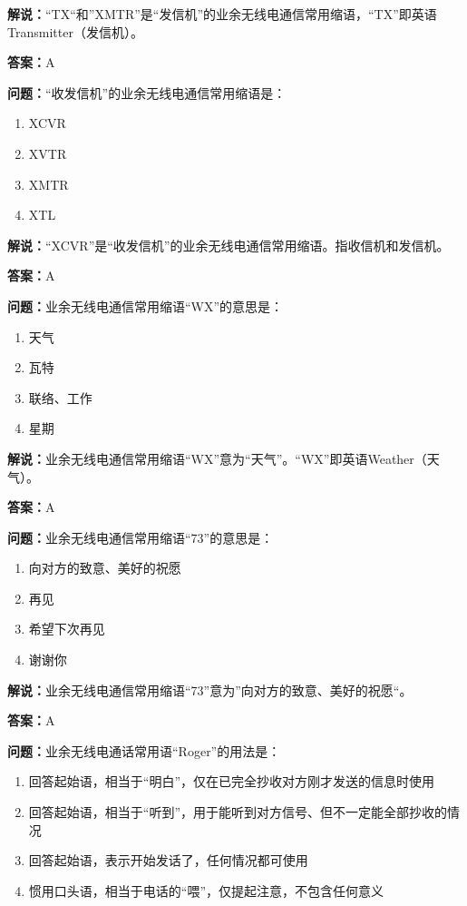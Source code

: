 \textbf{解说：}“TX“和”XMTR”是“发信机”的业余无线电通信常用缩语，“TX”即英语Transmitter（发信机）。

\textbf{答案：}A

\textbf{问题：}“收发信机”的业余无线电通信常用缩语是：

\begin{enumerate}[label=\Alph*), leftmargin=3em]
	\item XCVR
	\item XVTR
	\item XMTR
	\item XTL
\end{enumerate}

\textbf{解说：}“XCVR”是“收发信机”的业余无线电通信常用缩语。指收信机和发信机。

\textbf{答案：}A

\textbf{问题：}业余无线电通信常用缩语“WX”的意思是：

\begin{enumerate}[label=\Alph*), leftmargin=3em]
	\item 天气
	\item 瓦特
	\item 联络、工作
	\item 星期
\end{enumerate}

\textbf{解说：}业余无线电通信常用缩语“WX”意为“天气”。“WX”即英语Weather（天气）。

\textbf{答案：}A

\textbf{问题：}业余无线电通信常用缩语“73”的意思是：

\begin{enumerate}[label=\Alph*), leftmargin=3em]
	\item 向对方的致意、美好的祝愿
	\item 再见
	\item 希望下次再见
	\item 谢谢你
\end{enumerate}

\textbf{解说：}业余无线电通信常用缩语“73”意为”向对方的致意、美好的祝愿“。

\textbf{答案：}A

\textbf{问题：}业余无线电通话常用语“Roger”的用法是：

\begin{enumerate}[label=\Alph*), leftmargin=3em]
	\item 回答起始语，相当于“明白”，仅在已完全抄收对方刚才发送的信息时使用
	\item 回答起始语，相当于“听到”，用于能听到对方信号、但不一定能全部抄收的情况
	\item 回答起始语，表示开始发话了，任何情况都可使用
	\item 惯用口头语，相当于电话的“喂”，仅提起注意，不包含任何意义
\end{enumerate}


